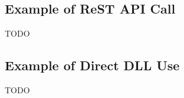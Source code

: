 \documentclass[letterpaper,10pt]{article}
\begin{document}
\subsection{Example of ReST API Call}

TODO

\begin{sequencediagram}
\end{sequencediagram}

\subsection{Example of Direct DLL Use}

TODO

\begin{sequencediagram}
\end{sequencediagram}

\end{document}
